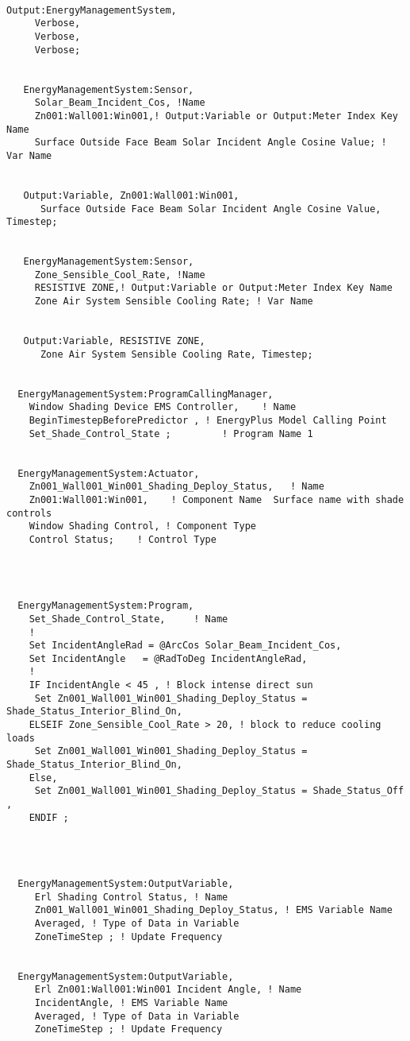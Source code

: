 \begin{lstlisting}

Output:EnergyManagementSystem,
     Verbose,
     Verbose,
     Verbose;


   EnergyManagementSystem:Sensor,
     Solar_Beam_Incident_Cos, !Name
     Zn001:Wall001:Win001,! Output:Variable or Output:Meter Index Key Name
     Surface Outside Face Beam Solar Incident Angle Cosine Value; ! Var Name


   Output:Variable, Zn001:Wall001:Win001,
      Surface Outside Face Beam Solar Incident Angle Cosine Value, Timestep;


   EnergyManagementSystem:Sensor,
     Zone_Sensible_Cool_Rate, !Name
     RESISTIVE ZONE,! Output:Variable or Output:Meter Index Key Name
     Zone Air System Sensible Cooling Rate; ! Var Name


   Output:Variable, RESISTIVE ZONE,
      Zone Air System Sensible Cooling Rate, Timestep;


  EnergyManagementSystem:ProgramCallingManager,
    Window Shading Device EMS Controller,    ! Name
    BeginTimestepBeforePredictor , ! EnergyPlus Model Calling Point
    Set_Shade_Control_State ;         ! Program Name 1


  EnergyManagementSystem:Actuator,
    Zn001_Wall001_Win001_Shading_Deploy_Status,   ! Name
    Zn001:Wall001:Win001,    ! Component Name  Surface name with shade controls
    Window Shading Control, ! Component Type
    Control Status;    ! Control Type




  EnergyManagementSystem:Program,
    Set_Shade_Control_State,     ! Name
    !
    Set IncidentAngleRad = @ArcCos Solar_Beam_Incident_Cos,
    Set IncidentAngle   = @RadToDeg IncidentAngleRad,
    !
    IF IncidentAngle < 45 , ! Block intense direct sun
     Set Zn001_Wall001_Win001_Shading_Deploy_Status = Shade_Status_Interior_Blind_On,
    ELSEIF Zone_Sensible_Cool_Rate > 20, ! block to reduce cooling loads
     Set Zn001_Wall001_Win001_Shading_Deploy_Status = Shade_Status_Interior_Blind_On,
    Else,
     Set Zn001_Wall001_Win001_Shading_Deploy_Status = Shade_Status_Off ,
    ENDIF ;




  EnergyManagementSystem:OutputVariable,
     Erl Shading Control Status, ! Name
     Zn001_Wall001_Win001_Shading_Deploy_Status, ! EMS Variable Name
     Averaged, ! Type of Data in Variable
     ZoneTimeStep ; ! Update Frequency


  EnergyManagementSystem:OutputVariable,
     Erl Zn001:Wall001:Win001 Incident Angle, ! Name
     IncidentAngle, ! EMS Variable Name
     Averaged, ! Type of Data in Variable
     ZoneTimeStep ; ! Update Frequency



\end{lstlisting}
